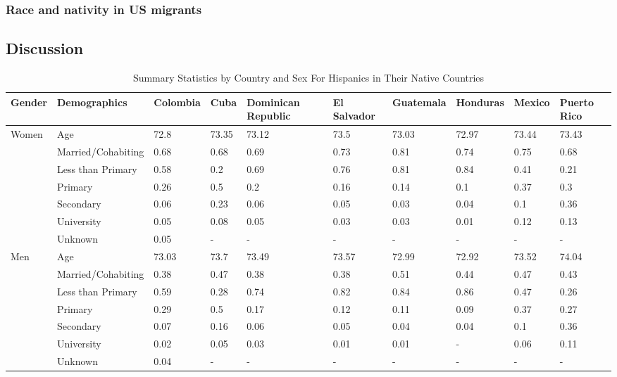 \documentclass[
]{article}
\begin{document}
\subsubsection{Race and nativity in US
migrants}\label{race-and-nativity-in-us-migrants}

\subsection{Discussion}\label{discussion}

\newpage

\begin{landscape}
\begin{table}[h!]
\centering
\caption{Summary Statistics by Country and Sex For Hispanics in Their Native Countries} 

\begingroup\small
\begin{tabular}{l|l|llllllll}
  \hline
Gender & Demographics & Colombia & Cuba & Dominican Republic & El Salvador & Guatemala & Honduras & Mexico & Puerto Rico \\ 
  \hline
Women & Age & 72.8 & 73.35 & 73.12 & 73.5 & 73.03 & 72.97 & 73.44 & 73.43 \\ 
   & Married/Cohabiting & 0.68 & 0.68 & 0.69 & 0.73 & 0.81 & 0.74 & 0.75 & 0.68 \\ 
   & Less than Primary & 0.58 & 0.2 & 0.69 & 0.76 & 0.81 & 0.84 & 0.41 & 0.21 \\ 
   & Primary & 0.26 & 0.5 & 0.2 & 0.16 & 0.14 & 0.1 & 0.37 & 0.3 \\ 
   & Secondary & 0.06 & 0.23 & 0.06 & 0.05 & 0.03 & 0.04 & 0.1 & 0.36 \\ 
   & University & 0.05 & 0.08 & 0.05 & 0.03 & 0.03 & 0.01 & 0.12 & 0.13 \\ 
   & Unknown & 0.05 & - & - & - & - & - & - & - \\ 
  Men & Age & 73.03 & 73.7 & 73.49 & 73.57 & 72.99 & 72.92 & 73.52 & 74.04 \\ 
   & Married/Cohabiting & 0.38 & 0.47 & 0.38 & 0.38 & 0.51 & 0.44 & 0.47 & 0.43 \\ 
   & Less than Primary & 0.59 & 0.28 & 0.74 & 0.82 & 0.84 & 0.86 & 0.47 & 0.26 \\ 
   & Primary & 0.29 & 0.5 & 0.17 & 0.12 & 0.11 & 0.09 & 0.37 & 0.27 \\ 
   & Secondary & 0.07 & 0.16 & 0.06 & 0.05 & 0.04 & 0.04 & 0.1 & 0.36 \\ 
   & University & 0.02 & 0.05 & 0.03 & 0.01 & 0.01 & - & 0.06 & 0.11 \\ 
   & Unknown & 0.04 & - & - & - & - & - & - & - \\ 
   \hline
\end{tabular}
\endgroup
\end{table}



\end{landscape}
\end{document}
